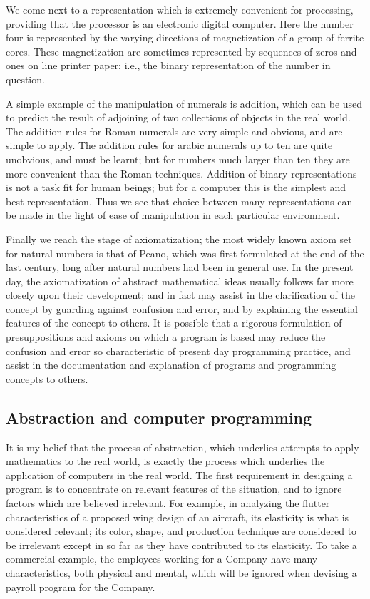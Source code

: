\documentclass[twoside,11pt]{book}
\begin{document}
We come next to a representation which is extremely convenient for processing, providing that the processor is an electronic digital computer. Here the number four is represented by the varying directions of magnetization of a group of ferrite cores. These magnetization are sometimes represented by sequences of zeros and ones on line printer paper; i.e., the binary representation of the number in question.

A simple example of the manipulation of numerals is addition, which can be used to predict the result of adjoining of two collections of objects in the real world. The addition rules for Roman numerals are very simple and obvious, and are simple to apply. The addition rules for arabic numerals up to ten are quite unobvious, and must be learnt; but for numbers much larger than ten they are more convenient than the Roman techniques. Addition of binary representations is not a task fit for human beings; but for a computer this is the simplest and best representation. Thus we see that choice between many representations can be made in the light of ease of manipulation in each particular environment.

Finally we reach the stage of axiomatization; the most widely known axiom set for natural numbers is that of Peano, which was first formulated at the end of the last century, long after natural numbers had been in general use. In the present day, the axiomatization of abstract mathematical ideas usually follows far more closely upon their development; and in fact may assist in the clarification of the concept by guarding against confusion and error, and by explaining the essential features of the concept to others. It is possible that a rigorous formulation of presuppositions and axioms on which a program is based may reduce the confusion and error so characteristic of present day programming practice, and assist in the documentation and explanation of programs and programming concepts to others.

\subsection{Abstraction and computer programming}

It is my belief that the process of abstraction, which underlies attempts to apply mathematics to the real world, is exactly the process which underlies the application of computers in the real world. The first requirement in designing a program is to concentrate on relevant features of the situation, and to ignore factors which are believed irrelevant. For example, in analyzing the flutter characteristics of a proposed wing design of an aircraft, its elasticity is what is considered relevant; its color, shape, and production technique are considered to be irrelevant except in so far as they have contributed to its elasticity. To take a commercial example, the employees working for a Company have many characteristics, both physical and mental, which will be ignored when devising a payroll program for the Company.
\end{document}
